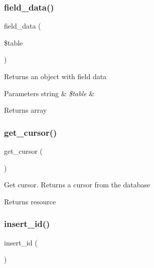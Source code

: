 \subsubsection{\texorpdfstring{field\+\_\+data()}{field\_data()}}
{\footnotesize\ttfamily field\+\_\+data (\begin{DoxyParamCaption}\item[{}]{\$table }\end{DoxyParamCaption})}

Returns an object with field data


\begin{DoxyParams}[1]{Parameters}
string & {\em \$table} & \\
\hline
\end{DoxyParams}
\begin{DoxyReturn}{Returns}
array 
\end{DoxyReturn}
\mbox{\label{class_c_i___d_b__oci8__driver_aaf8b241dc9ed2d812e965dc882ed9ea3}} 
\subsubsection{\texorpdfstring{get\+\_\+cursor()}{get\_cursor()}}
{\footnotesize\ttfamily get\+\_\+cursor (\begin{DoxyParamCaption}{ }\end{DoxyParamCaption})}

Get cursor. Returns a cursor from the database

\begin{DoxyReturn}{Returns}
resource 
\end{DoxyReturn}
\mbox{\label{class_c_i___d_b__oci8__driver_a933f2cde8dc7f87875e257d0a4902e99}} 
\subsubsection{\texorpdfstring{insert\+\_\+id()}{insert\_id()}}
{\footnotesize\ttfamily insert\+\_\+id (\begin{DoxyParamCaption}{ }\end{DoxyParamCaption})}

